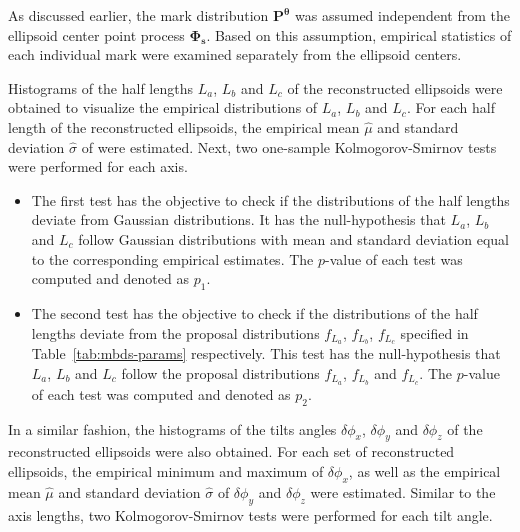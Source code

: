 \documentclass[journal]{IEEEtran}
\begin{document}

As discussed earlier, the mark distribution
$\mathbf{P}^{\boldsymbol{\theta}}$ was assumed independent from the
ellipsoid center point process $\mathbf{\Phi_{s}}$. Based on this
assumption, empirical statistics of each individual mark were examined
separately from the ellipsoid centers.


Histograms of the half lengths $L_a$, $L_b$ and $L_c$ of the
reconstructed ellipsoids were obtained to visualize the empirical
distributions of $L_a$, $L_b$ and $L_c$. For each half length of the
reconstructed ellipsoids, the empirical mean $\hat{\mu}$ and standard
deviation $\hat{\sigma}$ of were estimated. Next, two one-sample
Kolmogorov-Smirnov tests \cite{massey1951kolmogorov} were performed
for each axis.

\begin{itemize}

\item The first test has the objective to check if the distributions
  of the half lengths deviate from Gaussian distributions. It has the
  null-hypothesis that $L_a$, $L_b$ and $L_c$ follow Gaussian
  distributions with mean and standard deviation equal to the
  corresponding empirical estimates. The $p$-value of each test was
  computed and denoted as $p_1$.

\item The second test has the objective to check if the distributions
  of the half lengths deviate from the proposal distributions
  $f_{L_a}$, $f_{L_b}$, $f_{L_c}$ specified in
  Table~\ref{tab:mbds-params} respectively. This test has the
  null-hypothesis that $L_a$, $L_b$ and $L_c$ follow the proposal
  distributions $f_{L_a}$, $f_{L_b}$ and $f_{L_c}$. The $p$-value of
  each test was computed and denoted as $p_2$.

\end{itemize}


In a similar fashion, the histograms of the tilts angles
$\delta\phi_x$, $\delta\phi_y$ and $\delta\phi_z$ of the reconstructed
ellipsoids were also obtained. For each set of reconstructed
ellipsoids, the empirical minimum and maximum of $\delta\phi_x$, as
well as the empirical mean $\hat{\mu}$ and standard deviation
$\hat{\sigma}$ of $\delta\phi_y$ and $\delta\phi_z$ were
estimated. Similar to the axis lengths, two Kolmogorov-Smirnov tests
were performed for each tilt angle.
\end{document}

